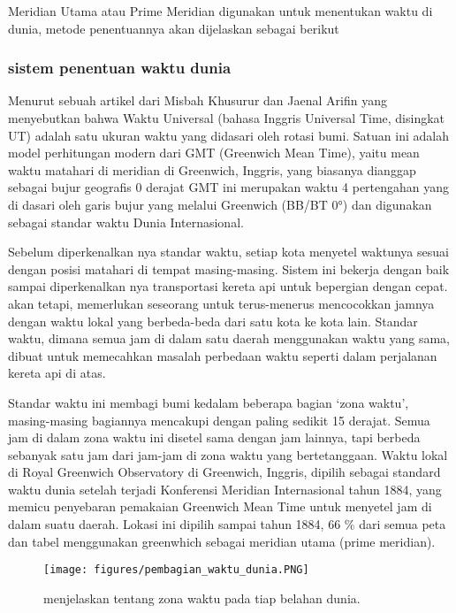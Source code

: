 	Meridian Utama atau Prime Meridian digunakan untuk menentukan waktu di dunia, metode penentuannya akan dijelaskan sebagai berikut


\subsubsection{sistem penentuan waktu dunia}
	

	Menurut sebuah artikel dari Misbah Khusurur dan Jaenal Arifin yang menyebutkan bahwa Waktu Universal (bahasa Inggris Universal Time, disingkat UT)
adalah satu ukuran waktu yang didasari oleh rotasi bumi. Satuan ini adalah model perhitungan modern dari GMT (Greenwich Mean Time), yaitu mean waktu matahari 
di meridian di Greenwich, Inggris, yang biasanya dianggap sebagai bujur geografis 0 derajat GMT ini merupakan waktu 4 pertengahan yang di dasari oleh 
garis bujur yang melalui Greenwich (BB/BT 0°) dan digunakan sebagai standar waktu Dunia Internasional.

	
	Sebelum diperkenalkan nya standar waktu, setiap kota menyetel waktunya sesuai dengan posisi matahari di tempat masing-masing. Sistem ini bekerja 
dengan baik sampai diperkenalkan nya transportasi kereta api untuk bepergian dengan cepat. akan tetapi, memerlukan seseorang untuk terus-menerus mencocokkan 
jamnya dengan waktu lokal yang berbeda-beda dari satu kota ke kota lain. Standar waktu, dimana semua jam di dalam satu daerah menggunakan waktu yang sama, 
dibuat untuk memecahkan masalah perbedaan waktu seperti dalam perjalanan kereta api di atas.


	Standar waktu ini membagi bumi kedalam beberapa bagian `zona waktu', masing-masing bagiannya mencakupi dengan paling sedikit 15 derajat. Semua jam di dalam
zona waktu ini disetel sama dengan jam lainnya, tapi berbeda sebanyak satu jam dari jam-jam di zona waktu yang bertetanggaan. 
Waktu lokal di Royal Greenwich Observatory di Greenwich, Inggris, dipilih sebagai standard waktu dunia setelah terjadi 
Konferensi Meridian Internasional tahun 1884, yang memicu penyebaran pemakaian Greenwich Mean Time untuk menyetel jam di dalam suatu daerah. 
Lokasi ini dipilih sampai tahun 1884, 66 \% dari semua peta dan tabel menggunakan greenwhich sebagai meridian utama (prime meridian).


\begin{figure}[ht]
\centerline{\texttt{[image: figures/pembagian\_waktu\_dunia.PNG]}}
\caption{menjelaskan tentang zona waktu pada tiap belahan dunia.}
\label{pembagian_waktu_dunia}
\end{figure}

